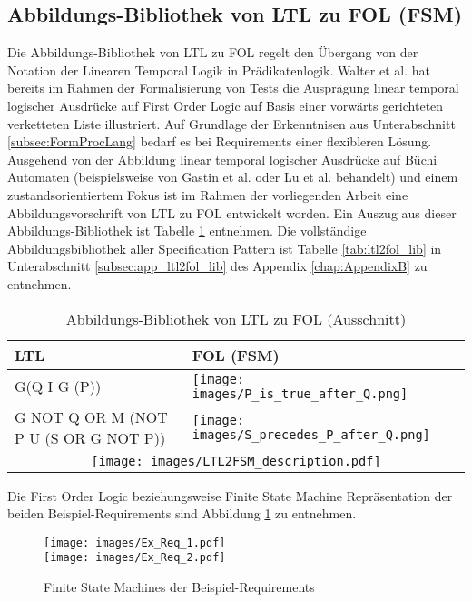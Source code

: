 \subsection{Abbildungs-Bibliothek von LTL zu FOL (FSM)}
\label{subsec:ltl2fol_lib}
Die Abbildungs-Bibliothek von LTL zu FOL regelt den Übergang von der Notation der Linearen Temporal Logik in Prädikatenlogik. Walter et al. \cite{WHPR17} hat bereits im Rahmen der Formalisierung von Tests die Ausprägung linear temporal logischer Ausdrücke auf First Order Logic auf Basis einer vorwärts gerichteten verketteten Liste illustriert. Auf Grundlage der Erkenntnisen aus Unterabschnitt \ref{subsec:FormProcLang} bedarf es bei Requirements einer flexibleren Lösung.\\
Ausgehend von der Abbildung linear temporal logischer Ausdrücke auf Büchi Automaten (beispielsweise von Gastin et al. \cite{GP01} oder Lu et al. \cite{LL12} behandelt) und einem zustandsorientiertem Fokus ist im Rahmen der vorliegenden Arbeit eine Abbildungsvorschrift von LTL zu FOL entwickelt worden. Ein Auszug aus dieser Abbildungs-Bibliothek ist Tabelle \ref{tab:extract_ltl2fol_lib} entnehmen. Die vollständige Abbildungsbibliothek aller Specification Pattern ist Tabelle \ref{tab:ltl2fol_lib} in Unterabschnitt \ref{subsec:app_ltl2fol_lib} des Appendix \ref{chap:AppendixB} zu entnehmen.
\begin{table}[H]
	\centering
	\begin{tabularx}{\textwidth}{|p{}|p{}|}
		\hline
		LTL & FOL (FSM) \\ \hline
		G(Q I G (P)) & \texttt{[image: images/P\_is\_true\_after\_Q.png]} \\ \hline
		G NOT Q OR M (NOT P U \newline(S OR G NOT P)) & \texttt{[image: images/S\_precedes\_P\_after\_Q.png]} \\ \hline
		\multicolumn{2}{|c|}{\hspace{0.5cm}\texttt{[image: images/LTL2FSM\_description.pdf]}} \\ \hline
	\end{tabularx}
	\caption{Abbildungs-Bibliothek von LTL zu FOL (Ausschnitt)}
	\label{tab:extract_ltl2fol_lib}
\end{table}
Die First Order Logic beziehungsweise Finite State Machine Repräsentation der beiden Beispiel-Requirements sind Abbildung \ref{imag:ex_req_FSM} zu entnehmen.
\begin{figure}
	\centering
	\texttt{[image: images/Ex\_Req\_1.pdf]}\\
	\texttt{[image: images/Ex\_Req\_2.pdf]}
	\caption{Finite State Machines der Beispiel-Requirements}
	\label{imag:ex_req_FSM}
\end{figure}
